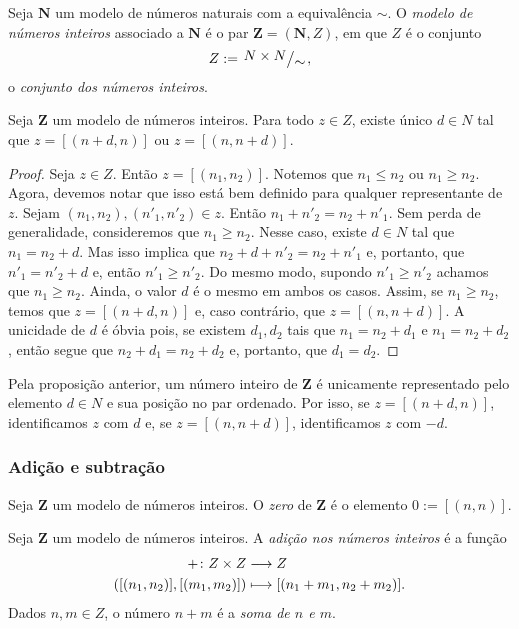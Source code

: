 \begin{definition}
	Seja $\bm N$ um modelo de números naturais com a equivalência $\sim$. O \emph{modelo de números inteiros} associado a $\bm N$ é o par $\bm Z = (\bm N,Z)$, em que $Z$ é o conjunto
	\begin{equation*}
	Z := \quo{N \times N}{\sim},
	\end{equation*}
o \emph{conjunto dos números inteiros}.
\end{definition}

\begin{proposition}
	Seja $\bm Z$ um modelo de números inteiros. Para todo $z \in Z$, existe único $d \in N$ tal que $z=[(n+d,n)]$ ou $z=[(n,n+d)]$.
\end{proposition}
\begin{proof}
	Seja $z \in Z$. Então $z=[(n_1,n_2)]$. Notemos que $n_1 \leq n_2$ ou $n_1 \geq n_2$. Agora, devemos notar que isso está bem definido para qualquer representante de $z$. Sejam $(n_1,n_2),(n'_1,n'_2) \in z$. Então $n_1+n'_2=n_2+n'_1$. Sem perda de generalidade, consideremos que $n_1 \geq n_2$. Nesse caso, existe $d \in N$ tal que $n_1=n_2+d$. Mas isso implica que $n_2+d+n'_2=n_2+n'_1$ e, portanto, que $n'_1=n'_2+d$ e, então $n'_1 \geq n'_2$. Do mesmo modo, supondo $n'_1 \geq n'_2$ achamos que $n_1 \geq n_2$. Ainda, o valor $d$ é o mesmo em ambos os casos. Assim, se $n_1 \geq n_2$, temos que $z=[(n+d,n)]$ e, caso contrário, que $z=[(n,n+d)]$. A unicidade de $d$ é óbvia pois, se existem $d_1,d_2$ tais que $n_1=n_2+d_1$ e $n_1=n_2+d_2$, então segue que $n_2+d_1=n_2+d_2$ e, portanto, que $d_1=d_2$.
\end{proof}

	Pela proposição anterior, um número inteiro de $\bm Z$ é unicamente representado pelo elemento $d \in N$ e sua posição no par ordenado. Por isso, se $z=[(n+d,n)]$, identificamos $z$ com $d$ e, se $z=[(n,n+d)]$, identificamos $z$ com $-d$.


\subsubsection{Adição e subtração}

\begin{definition}
Seja $\bm Z$ um modelo de números inteiros. O \emph{zero} de $\bm Z$ é o elemento $0 := [(n,n)]$.
\end{definition}

\begin{definition}
Seja $\bm Z$ um modelo de números inteiros. A \emph{adição nos números inteiros} é a função
	\begin{align*}
	{+}\colon {Z \times Z} &\longrightarrow {Z} \\{([(n_1,n_2)],[(m_1,m_2)])} &\longmapsto [(n_1+m_1,n_2+m_2)].
	\end{align*}
Dados $n,m \in Z$, o número $n+m$ é a \emph{soma de $n$ e $m$}.
\end{definition}

